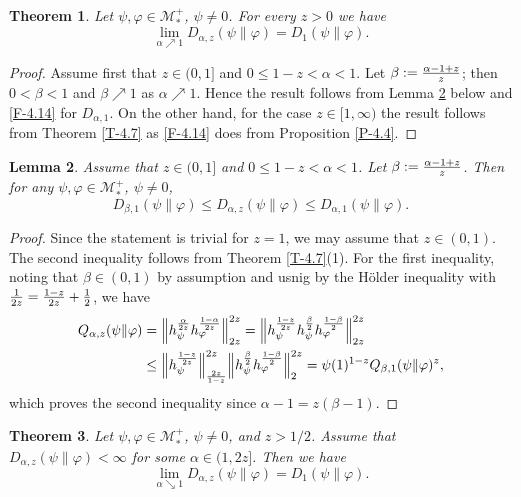 \documentclass[12pt]{article}
\newtheorem{theorem}{Theorem}[section]
\newtheorem{lemma}[theorem]{Lemma}
\theoremstyle{definition}
\theoremstyle{remark}
\numberwithin{equation}{section}
\def\Me{\mathcal M}
\def\ffi{\varphi}
\begin{document}
\begin{theorem}
Let $\psi,\ffi\in\Me_*^+$, $\psi\ne0$. For every $z>0$ we have
\[
\lim_{\alpha\nearrow1}D_{\alpha,z}(\psi\|\ffi)=D_1(\psi\|\ffi).
\]
\end{theorem}

\begin{proof}
Assume first that $z\in(0,1]$ and $0\le1-z<\alpha<1$. Let $\beta:={\alpha-1+z\over z}$; then
$0<\beta<1$ and $\beta\nearrow1$ as $\alpha\nearrow1$. Hence the result follows from Lemma \ref{L-5.8}
below and \eqref{F-4.14} for $D_{\alpha,1}$. On the other hand, for the case $z\in[1,\infty)$ the result
follows from Theorem \ref{T-4.7} as \eqref{F-4.14} does from Proposition \ref{P-4.4}.
\end{proof}

\begin{lemma}\label{L-5.8}
Assume that $z\in(0,1]$ and $0\le1-z<\alpha<1$. Let $\beta:={\alpha-1+z\over z}$. Then for any
$\psi,\ffi\in\Me_*^+$, $\psi\ne0$,
\[
D_{\beta,1}(\psi\|\ffi)\le D_{\alpha,z}(\psi\|\ffi)\le D_{\alpha,1}(\psi\|\ffi).
\]
\end{lemma}

\begin{proof}
Since the statement is trivial for $z=1$, we may assume that $z\in(0,1)$. The second inequality follows
from Theorem \ref{T-4.7}(1). For the first inequality, noting that $\beta\in(0,1)$ by assumption and usnig
by the H\"older inequality with ${1\over2z}={1-z\over2z}+{1\over2}$, we have
\begin{align*}
Q_{\alpha,z}(\psi\|\ffi)&=\Big\|h_\psi^{\alpha\over2z}h_\ffi^{1-\alpha\over2z}\Big\|_{2z}^{2z}
=\Big\|h_\psi^{1-z\over2z}h_\psi^{\beta\over2}h_\ffi^{1-\beta\over2}\Big\|_{2z}^{2z} \\
&\le\Big\|h_\psi^{1-z\over2z}\Big\|_{2z\over1-z}^{2z}
\Big\|h_\psi^{\beta\over2}h_\ffi^{1-\beta\over2}\Big\|_2^{2z}
=\psi(1)^{1-z}Q_{\beta,1}(\psi\|\ffi)^z,
\end{align*}
which proves the second inequality since $\alpha-1=z(\beta-1)$.
\end{proof}

\begin{theorem}\label{T-5.9}
Let $\psi,\ffi\in\Me_*^+$, $\psi\ne0$, and $z>1/2$. Assume that $D_{\alpha,z}(\psi\|\ffi)<\infty$ for some
$\alpha\in(1,2z]$. Then we have
\[
\lim_{\alpha\searrow1}D_{\alpha,z}(\psi\|\ffi)=D_1(\psi\|\ffi).
\]
\end{theorem}
\end{document}
